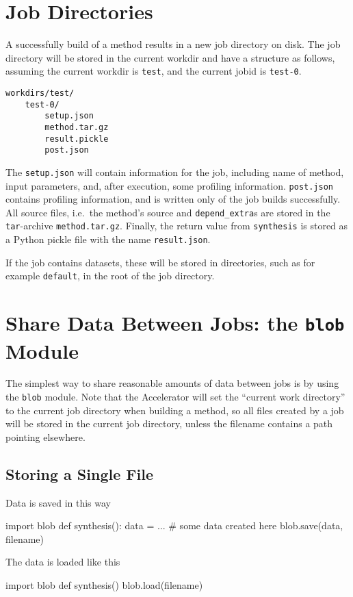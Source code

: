 \newpage


\section{Job Directories}
A successfully build of a method results in a new job directory on
disk.  The job directory will be stored in the current workdir and
have a structure as follows, assuming the current workdir
is \texttt{test}, and the current jobid is \texttt{test-0}.
\begin{verbatim}
workdirs/test/
    test-0/
        setup.json
        method.tar.gz
        result.pickle
        post.json
\end{verbatim}
The \texttt{setup.json} will contain information for the job,
including name of method, input parameters, and, after execution, some
profiling information.  \texttt{post.json} contains profiling
information, and is written only of the job builds successfully.  All
source files, i.e.\ the method's source and \texttt{depend\_extra}s
are stored in the \texttt{tar}-archive \texttt{method.tar.gz}.
Finally, the return value from \texttt{synthesis} is stored as a
Python pickle file with the name \texttt{result.json}.

If the job contains datasets, these will be stored in directories,
such as for example \texttt{default}, in the root of the job
directory.





\clearpage
\section{Share Data Between Jobs:  the \texttt{blob} Module}

The simplest way to share reasonable amounts of data between jobs is
by using the \texttt{blob} module.  Note that the Accelerator will set
the ``current work directory'' to the current job directory when
building a method, so all files created by a job will be stored in the
current job directory, unless the filename contains a path pointing
elsewhere.

\subsection*{Storing a  Single File}
Data is saved in this way
\begin{python}
import blob
def synthesis():
    data = ...  # some data created here
    blob.save(data, filename)
\end{python}
The data is loaded like this
\begin{python}
import blob
def synthesis()
    blob.load(filename)
\end{python}

